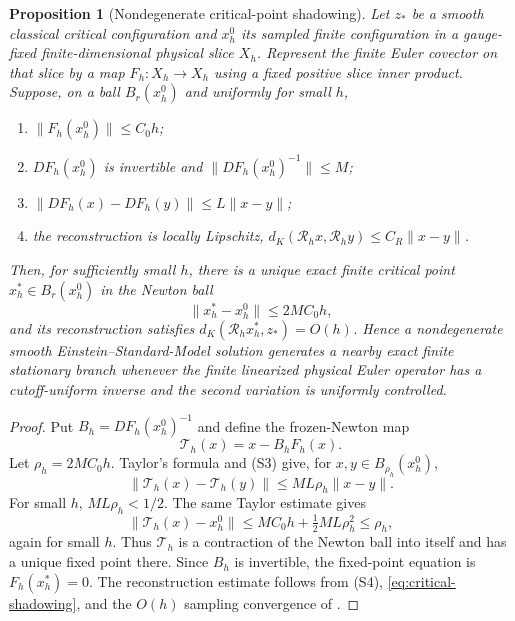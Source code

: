 \documentclass[11pt]{article}
\numberwithin{equation}{section}
\newtheorem{proposition}[proposition]{Proposition}
\theoremstyle{definition}
\theoremstyle{remark}
\newcommand{\norm}[1]{\lVert#1\rVert}
\begin{document}
\begin{proposition}[Nondegenerate critical-point shadowing]
\label{prop:critical-shadowing}
Let $z_*$ be a smooth classical critical configuration and $x_h^0$ its sampled finite configuration in a gauge-fixed finite-dimensional physical slice $X_h$.  Represent the finite Euler covector on that slice by a map $F_h:X_h\to X_h$ using a fixed positive slice inner product.  Suppose, on a ball $B_r(x_h^0)$ and uniformly for small $h$,
\begin{enumerate}[label=\textup{(S\arabic*)},leftmargin=3.2em]
\item $\norm{F_h(x_h^0)}\le C_0h$;
\item $D F_h(x_h^0)$ is invertible and $\norm{D F_h(x_h^0)^{-1}}\le M$;
\item $\norm{D F_h(x)-D F_h(y)}\le L\norm{x-y}$;
\item the reconstruction is locally Lipschitz, $d_K(\mathcal R_hx,\mathcal R_hy)\le C_R\norm{x-y}$.
\end{enumerate}
Then, for sufficiently small $h$, there is a unique exact finite critical point $x_h^*\in B_r(x_h^0)$ in the Newton ball
\begin{equation}
 \norm{x_h^*-x_h^0}\le 2MC_0h,
 \label{eq:critical-shadowing}
\end{equation}
and its reconstruction satisfies $d_K(\mathcal R_hx_h^*,z_*)=O(h)$.  Hence a nondegenerate smooth Einstein--Standard-Model solution generates a nearby exact finite stationary branch whenever the finite linearized physical Euler operator has a cutoff-uniform inverse and the second variation is uniformly controlled.
\end{proposition}
\begin{proof}
Put $B_h=D F_h(x_h^0)^{-1}$ and define the frozen-Newton map
\[
 \mathcal T_h(x)=x-B_hF_h(x).
\]
Let $\rho_h=2MC_0h$.  Taylor's formula and (S3) give, for $x,y\in B_{\rho_h}(x_h^0)$,
\[
 \norm{\mathcal T_h(x)-\mathcal T_h(y)}
 \le ML\rho_h\norm{x-y}.
\]
For small $h$, $ML\rho_h<1/2$.  The same Taylor estimate gives
\[
 \norm{\mathcal T_h(x)-x_h^0}
 \le MC_0h+\tfrac12ML\rho_h^2\le\rho_h,
\]
again for small $h$.  Thus $\mathcal T_h$ is a contraction of the Newton ball into itself and has a unique fixed point there.  Since $B_h$ is invertible, the fixed-point equation is $F_h(x_h^*)=0$.  The reconstruction estimate follows from (S4), \eqref{eq:critical-shadowing}, and the $O(h)$ sampling convergence of .
\end{proof}
\end{document}
